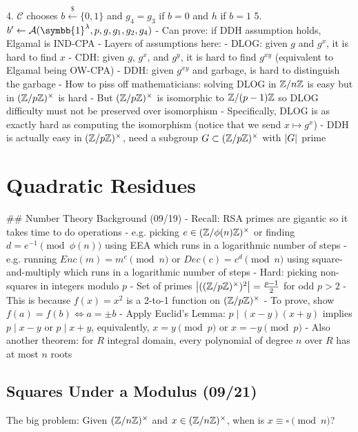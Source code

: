 \documentclass[notes]{agony}
\newcommand{\xgets}{\xleftarrow}
\newcommand{\one}{\symbb{1}}
\begin{document}
\begin{markdown}
        4. $\mathcal C$ chooses $b \xgets{\$} \{0,1\}$ and $g_4 = g_3$ if $b=0$ and $h$ if $b=1$
        5. $b' \gets \mathcal A(\one^\lambda,p,g,g_1,g_2,g_4)$
    - Can prove: if DDH assumption holds, Elgamal is IND-CPA
- Layers of assumptions here:
    - DLOG: given $g$ and $g^x$, it is hard to find $x$
    - CDH: given $g$, $g^x$, and $g^y$, it is hard to find $g^{xy}$ (equivalent to Elgamal being OW-CPA)
    - DDH: given $g^{xy}$ and garbage, is hard to distinguish the garbage
- How to piss off mathematicians: solving DLOG in $\mathbb{Z}/n\mathbb{Z}$ is easy but in $(\mathbb{Z}/p\mathbb{Z})^\times$ is hard
    - But $(\mathbb{Z}/p\mathbb{Z})^\times$ is isomorphic to $\mathbb{Z}/(p-1)\mathbb{Z}$ so DLOG difficulty must not be preserved over isomorphism
    - Specifically, DLOG is as exactly hard as computing the isomorphism (notice that we send $x \mapsto g^x$)
- DDH is actually easy in $(\mathbb{Z}/p\mathbb{Z})^\times$, need a subgroup $G \subset (\mathbb{Z}/p\mathbb{Z})^\times$ with $\abs{G}$ prime
\end{markdown}


\chapter{Quadratic Residues}

\begin{markdown}
## Number Theory Background (09/19)
- Recall: RSA primes are gigantic so it takes time to do operations
    - e.g. picking $e \in (\mathbb{Z}/\phi(n)\mathbb{Z})^\times$ or finding $d = e^{-1} \pmod{\phi(n)}$ using EEA which runs in a logarithmic number of steps
    - e.g. running $Enc(m) = m^e \pmod n$ or $Dec(c) = c^d \pmod n$ using square-and-multiply which runs in a logarithmic number of steps
- Hard: picking non-squares in integers modulo $p$
    - Set of primes $\abs{((\mathbb{Z}/p\mathbb{Z})^\times)^2} = \frac{p-1}{2}$ for odd $p > 2$
    - This is because $f(x) = x^2$ is a 2-to-1 function on $(\mathbb{Z}/p\mathbb{Z})^\times$
        - To prove, show $f(a) = f(b) \iff a = \pm b$
        - Apply Euclid's Lemma: $p \mid (x-y)(x+y)$ implies $p \mid x-y$ or $p \mid x+y$, equivalently, $x = y \pmod p$ or $x = -y \pmod p$
        - Also another theorem: for $R$ integral domain, every polynomial of degree $n$ over $R$ has at most $n$ roots
\end{markdown}

\section{Squares Under a Modulus (09/21)}
The big problem: Given $(\mathbb{Z}/n\mathbb{Z})^\times$ and $x \in (\mathbb{Z}/n\mathbb{Z})^\times$, when is $x \equiv \square \pmod n$?
\end{document}
